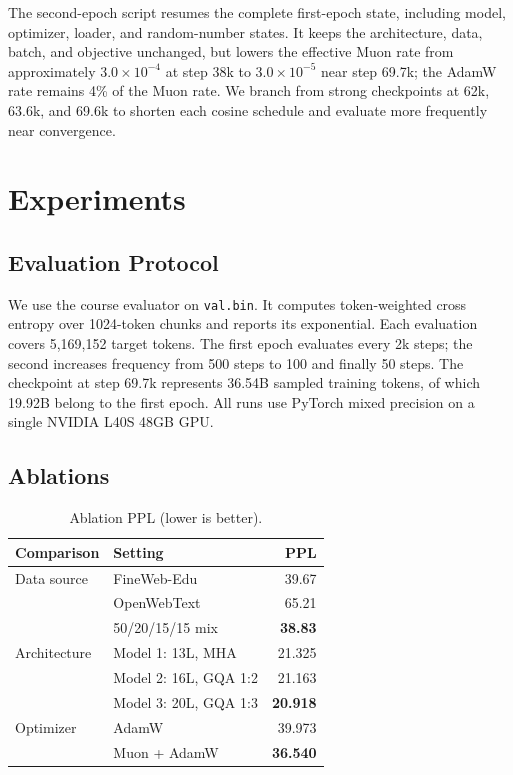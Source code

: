 \documentclass{article}
\begin{document}
The second-epoch script resumes the complete first-epoch state, including
model, optimizer, loader, and random-number states. It keeps the architecture,
data, batch, and objective unchanged, but lowers the effective Muon rate from
approximately
$3.0{\times}10^{-4}$ at step 38k to $3.0{\times}10^{-5}$ near step 69.7k;
the AdamW rate remains 4\% of the Muon rate. We branch from strong
checkpoints at 62k, 63.6k, and 69.6k to shorten each cosine schedule and
evaluate more frequently near convergence.

\section{Experiments}

\subsection{Evaluation Protocol}

We use the course evaluator on \texttt{val.bin}. It computes token-weighted
cross entropy over 1024-token chunks and reports its exponential. Each
evaluation covers 5,169,152 target tokens. The first epoch evaluates every 2k
steps; the second increases frequency from 500 steps to 100 and finally 50
steps. The checkpoint at step 69.7k represents 36.54B sampled training tokens,
of which 19.92B belong to the first epoch. All runs use PyTorch mixed precision
on a single NVIDIA L40S 48GB GPU.

\subsection{Ablations}

\begin{table}
  \vspace{-0.75\baselineskip}
  \caption{Ablation PPL (lower is better).}
  \label{tab:ablations}
  \centering
  \scriptsize
  \setlength{\tabcolsep}{2.8pt}
  \begin{tabular}{@{}llr@{}}
    \toprule
    Comparison & Setting & PPL \\
    \midrule
    Data source & FineWeb-Edu & 39.67 \\
              & OpenWebText & 65.21 \\
              & 50/20/15/15 mix & \textbf{38.83} \\
    \midrule
    Architecture & Model 1: 13L, MHA & 21.325 \\
                       & Model 2: 16L, GQA 1:2 & 21.163 \\
                       & Model 3: 20L, GQA 1:3 & \textbf{20.918} \\
    \midrule
    Optimizer & AdamW & 39.973 \\
                   & Muon + AdamW & \textbf{36.540} \\
    \bottomrule
  \end{tabular}
\end{table}
\end{document}
